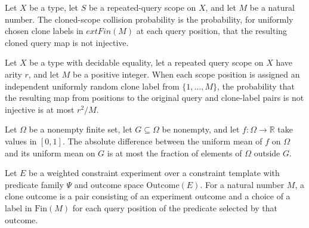 \begin{definition}
\label{FABL.RepeatedQueryScope.clonedScopeCollisionProbability}
\leanok
{}
Let $X$ be a type, let $S$ be a repeated-query scope on $X$, and let $M$ be a natural
number. The cloned-scope collision probability is the probability, for uniformly chosen
clone labels in $	ext{Fin}(M)$ at each query position, that the resulting cloned query
map is not injective.
\end{definition}

\begin{theorem}
\label{FABL.RepeatedQueryScope.clonedScopeCollisionProbability_le}
\leanok
{}
Let $X$ be a type with decidable equality, let a repeated query scope on $X$ have arity
$r$, and let $M$ be a positive integer. When each scope position is assigned an
independent uniformly random clone label from $\{1,\ldots,M\}$, the probability that the
resulting map from positions to the original query and clone-label pairs is not
injective is at most $r^2/M$.
\end{theorem}

\begin{theorem}
\label{FABL.WeightedConstraintExperiment.abs_uniformExpectation_subtype_le_failureProbability}
\leanok
{}
Let $\Omega$ be a nonempty finite set, let $G\subseteq\Omega$ be nonempty, and let
$f:\Omega\to\mathbb{R}$ take values in $[0,1]$. The absolute difference between the
uniform mean of $f$ on $\Omega$ and its uniform mean on $G$ is at most the fraction of
elements of $\Omega$ outside $G$.
\end{theorem}

\begin{definition}
\label{FABL.WeightedConstraintExperiment.CloneOutcome}
\leanok
Let $E$ be a weighted constraint experiment over a constraint template with predicate
family $\Psi$ and outcome space $\mathrm{Outcome}(E)$. For a natural number $M$,
a clone outcome is a pair consisting of an experiment outcome and a choice of a label in
$\text{Fin}(M)$ for each query position of the predicate selected by that outcome.
\end{definition}

